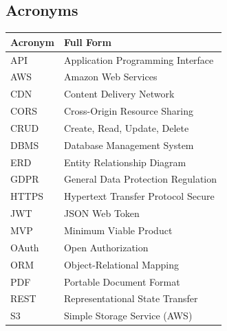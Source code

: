 \subsection{Acronyms}

\begin{table}[H]
    \centering
    \begin{tabularx}{\textwidth}{|l|X|}
        \hline
        \textbf{Acronym} & \textbf{Full Form}                              \\
        \hline
        API              & Application Programming Interface               \\
        \hline
        AWS              & Amazon Web Services                             \\
        \hline
        CDN              & Content Delivery Network                        \\
        \hline
        CORS             & Cross-Origin Resource Sharing                   \\
        \hline
        CRUD             & Create, Read, Update, Delete                    \\
        \hline
        DBMS             & Database Management System                      \\
        \hline
        ERD              & Entity Relationship Diagram                     \\
        \hline
        GDPR             & General Data Protection Regulation              \\
        \hline
        HTTPS            & Hypertext Transfer Protocol Secure              \\
        \hline
        JWT              & JSON Web Token                                  \\
        \hline
        MVP              & Minimum Viable Product                          \\
        \hline
        OAuth            & Open Authorization                              \\
        \hline
        ORM              & Object-Relational Mapping                       \\
        \hline
        PDF              & Portable Document Format                        \\
        \hline
        REST             & Representational State Transfer                 \\
        \hline
        S3               & Simple Storage Service (AWS)                    \\

\end{tabularx}
\end{table}
